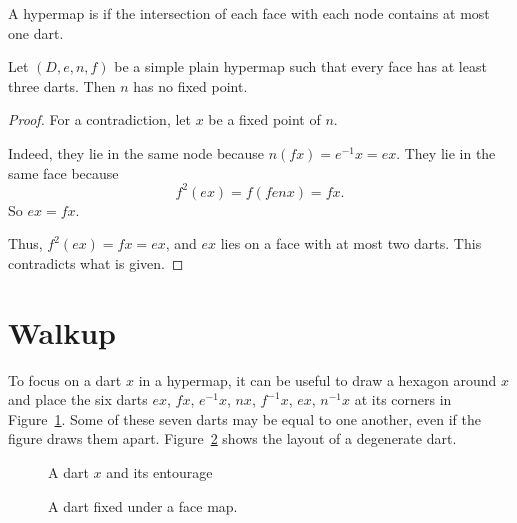 \begin{definition}[simple] 
A hypermap is  if the intersection of each face with
each node contains at most one dart.  %
\end{definition}


\begin{lemma} 
Let $(D,e,n,f)$ be a simple plain hypermap such that every face has
at least three darts.
Then $n$ has no fixed point.
%
\end{lemma}

\begin{proof} For a contradiction, let $x$ be a fixed point of
$n$. 

  Indeed, they lie in the same node
because $n(f x) = e^{-1} x = e x$. They lie in the same face because
\begin{displaymath}f^2 (e x) = f (f e n x) = f x.\end{displaymath}
So $e x = f x$.

Thus, $f^2 (e x) = f x = e x$, and $e x$ lies on a
face with at most two darts.  This contradicts what is given.
\end{proof}




\section{Walkup}

To focus on a dart $x$ in a
hypermap, it can be useful to draw a hexagon around $x$ and place
the six darts $e x$,
$f x$, $e^{-1} x$, $n x$,  $f^{-1} x$, $e x$, $n^{-1} x$  at its corners
in Figure~\ref{fig:dart+}.  Some of these seven darts may be
equal to one another, even if the figure draws them apart.
Figure~\ref{fig:dart-fix} shows the layout of a degenerate dart.
%

\begin{figure}[htb]
\centering
{}
\caption{A dart $x$ and its entourage}
\label{fig:dart+}
\end{figure}

\begin{figure}[htb]
\centering
{}
\caption{A dart fixed under a face map.}
\label{fig:dart-fix}
\end{figure}

